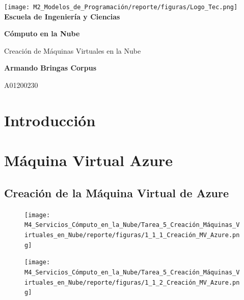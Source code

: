 \documentclass[12pt,a4paper]{article}
\begin{document}
\begin{titlepage}
    \centering
    \texttt{[image: M2\_Modelos\_de\_Programación/reporte/figuras/Logo\_Tec.png]}\\
    \vspace{.5cm}
    \bfseries\large Escuela de Ingeniería y Ciencias
        
    \vspace{5cm}
    \centering
    \textbf{\Huge Cómputo en la Nube}
    \vspace{0.5cm}
        
    {\Large Creación de Máquinas Virtuales en la Nube}

    \vspace{5cm}
        
    \textbf{\LARGE Armando Bringas Corpus}
        
    \vspace{0.5cm}
        
    {\large A01200230}
        
    \vfill
        
\end{titlepage}

\section{Introducción}

\section{Máquina Virtual Azure}

\subsection{Creación de la Máquina Virtual de Azure}

\begin{figure}[H]
    \centering
    \texttt{[image: M4\_Servicios\_Cómputo\_en\_la\_Nube/Tarea\_5\_Creación\_Máquinas\_Virtuales\_en\_Nube/reporte/figuras/1\_1\_1\_Creación\_MV\_Azure.png]}
    \label{fig:Azure_1}
\end{figure}

\begin{figure}[H]
    \centering
    \texttt{[image: M4\_Servicios\_Cómputo\_en\_la\_Nube/Tarea\_5\_Creación\_Máquinas\_Virtuales\_en\_Nube/reporte/figuras/1\_1\_2\_Creación\_MV\_Azure.png]}
    \label{fig:Azure_2}
\end{figure}
\end{document}
